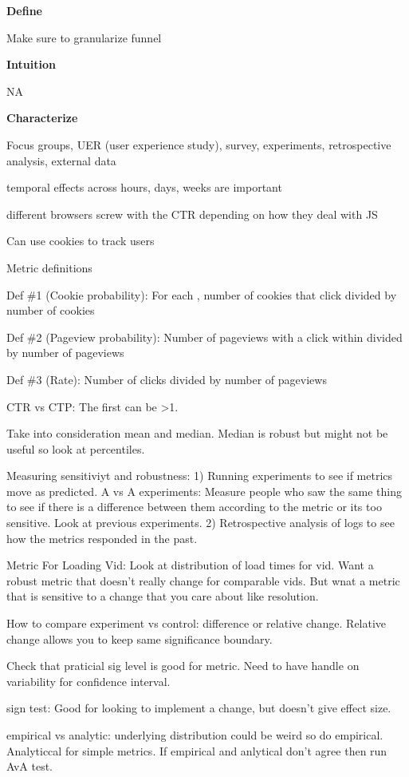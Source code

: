 \documentclass[]{book}
\begin{document}
\textbf{Define}

Make sure to granularize funnel

\textbf{Intuition}

NA

\textbf{Characterize}

Focus groups, UER (user experience study), survey, experiments,
retrospective analysis, external data

temporal effects across hours, days, weeks are important

different browsers screw with the CTR depending on how they deal with JS

Can use cookies to track users

Metric definitions

Def \#1 (Cookie probability): For each , number of cookies that click
divided by number of cookies

Def \#2 (Pageview probability): Number of pageviews with a click within
divided by number of pageviews

Def \#3 (Rate): Number of clicks divided by number of pageviews

CTR vs CTP: The first can be \textgreater{}1.

Take into consideration mean and median. Median is robust but might not
be useful so look at percentiles.

Measuring sensitiviyt and robustness: 1) Running experiments to see if
metrics move as predicted. A vs A experiments: Measure people who saw
the same thing to see if there is a difference between them according to
the metric or its too sensitive. Look at previous experiments. 2)
Retrospective analysis of logs to see how the metrics responded in the
past.

Metric For Loading Vid: Look at distribution of load times for vid. Want
a robust metric that doesn't really change for comparable vids. But wnat
a metric that is sensitive to a change that you care about like
resolution.

How to compare experiment vs control: difference or relative change.
Relative change allows you to keep same significance boundary.

Check that praticial sig level is good for metric. Need to have handle
on variability for confidence interval.

sign test: Good for looking to implement a change, but doesn't give
effect size.

empirical vs analytic: underlying distribution could be weird so do
empirical. Analyticcal for simple metrics. If empirical and anlytical
don't agree then run AvA test.
\end{document}
